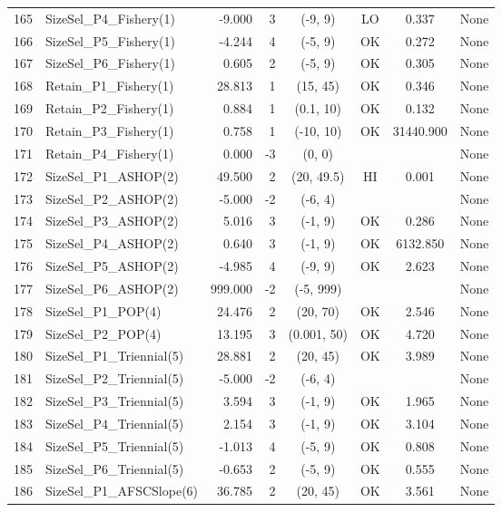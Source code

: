 \documentclass[12pt,]{article}
\begin{document}
\begin{landscape}
\begin{longtable}{rlrrcccl}
  165 & SizeSel\_P4\_Fishery(1) & -9.000 & 3 & (-9, 9) & LO & 0.337 & None \\ 
  166 & SizeSel\_P5\_Fishery(1) & -4.244 & 4 & (-5, 9) & OK & 0.272 & None \\ 
  167 & SizeSel\_P6\_Fishery(1) & 0.605 & 2 & (-5, 9) & OK & 0.305 & None \\ 
  168 & Retain\_P1\_Fishery(1) & 28.813 & 1 & (15, 45) & OK & 0.346 & None \\ 
  169 & Retain\_P2\_Fishery(1) & 0.884 & 1 & (0.1, 10) & OK & 0.132 & None \\ 
  170 & Retain\_P3\_Fishery(1) & 0.758 & 1 & (-10, 10) & OK & 31440.900 & None \\ 
  171 & Retain\_P4\_Fishery(1) & 0.000 & -3 & (0, 0) &  &  & None \\ 
  172 & SizeSel\_P1\_ASHOP(2) & 49.500 & 2 & (20, 49.5) & HI & 0.001 & None \\ 
  173 & SizeSel\_P2\_ASHOP(2) & -5.000 & -2 & (-6, 4) &  &  & None \\ 
  174 & SizeSel\_P3\_ASHOP(2) & 5.016 & 3 & (-1, 9) & OK & 0.286 & None \\ 
  175 & SizeSel\_P4\_ASHOP(2) & 0.640 & 3 & (-1, 9) & OK & 6132.850 & None \\ 
  176 & SizeSel\_P5\_ASHOP(2) & -4.985 & 4 & (-9, 9) & OK & 2.623 & None \\ 
  177 & SizeSel\_P6\_ASHOP(2) & 999.000 & -2 & (-5, 999) &  &  & None \\ 
  178 & SizeSel\_P1\_POP(4) & 24.476 & 2 & (20, 70) & OK & 2.546 & None \\ 
  179 & SizeSel\_P2\_POP(4) & 13.195 & 3 & (0.001, 50) & OK & 4.720 & None \\ 
  180 & SizeSel\_P1\_Triennial(5) & 28.881 & 2 & (20, 45) & OK & 3.989 & None \\ 
  181 & SizeSel\_P2\_Triennial(5) & -5.000 & -2 & (-6, 4) &  &  & None \\ 
  182 & SizeSel\_P3\_Triennial(5) & 3.594 & 3 & (-1, 9) & OK & 1.965 & None \\ 
  183 & SizeSel\_P4\_Triennial(5) & 2.154 & 3 & (-1, 9) & OK & 3.104 & None \\ 
  184 & SizeSel\_P5\_Triennial(5) & -1.013 & 4 & (-5, 9) & OK & 0.808 & None \\ 
  185 & SizeSel\_P6\_Triennial(5) & -0.653 & 2 & (-5, 9) & OK & 0.555 & None \\ 
  186 & SizeSel\_P1\_AFSCSlope(6) & 36.785 & 2 & (20, 45) & OK & 3.561 & None \\ 

\end{longtable}
\end{landscape}
\end{document}
